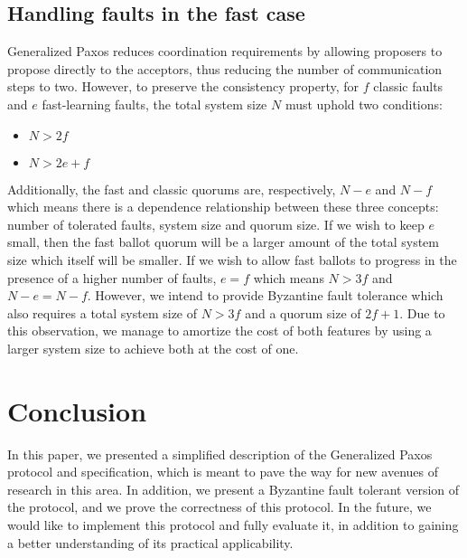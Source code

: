 

\subsection{Handling faults in the fast case}

Generalized Paxos reduces coordination requirements by allowing proposers to propose directly to the acceptors, thus reducing the number of communication steps to two. However, to preserve the consistency property, for $f$ classic faults and $e$ fast-learning faults, the total system size $N$ must uphold two conditions:
\begin{itemize}
	\item $N > 2f$
	\item $N > 2e+f$
\end{itemize} 
Additionally, the fast and classic quorums are, respectively, $N-e$ and $N-f$ which means there is a dependence relationship between these three concepts: number of tolerated faults, system size and quorum size. If we wish to keep $e$ small, then the fast ballot quorum will be a larger amount of the total system size which itself will be smaller. If we wish to allow fast ballots to progress in the presence of a higher number of faults, $e=f$ which means $N >3f$ and $N-e=N-f$. However, we intend to provide Byzantine fault tolerance which also requires a total system size of $N>3f$ and a quorum size of $2f+1$. Due to this observation, we manage to amortize the cost of both features by using a larger system size to achieve both at the cost of one. \par



\section{Conclusion}
\label{sec:conc}
In this paper, we presented a simplified description of the Generalized Paxos protocol and specification, which is meant to pave the way for new avenues of research in this area. In addition, we present a Byzantine fault tolerant version of the protocol, and we prove the correctness of this protocol. In the future, we would like to implement this protocol and fully evaluate it, in addition to gaining a better understanding of its practical applicability.
